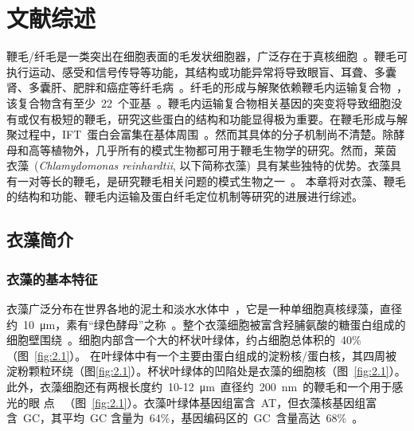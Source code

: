 \chapter{文献综述}
\renewcommand{\leftmark}{第二章\quad 文献综述}
\renewcommand{\figurename}{图}

鞭毛/纤毛是一类突出在细胞表面的毛发状细胞器，广泛存在于真核细胞\
\citep{Ishikawa2011,Hildebrandt2011,Scholey2003,Fliegauf2007}。鞭毛可执行运动、感受和信号传导等功能，其结构或功能异常将导致眼盲、耳聋、多囊肾、多囊肝、肥胖和癌症等纤毛病\
\citep{Fliegauf2007,Hildebrandt2007,Hildebrandt2011,Gerdes2009}。纤毛的形成与解聚依赖鞭毛内运输复合物\
\citep{Bhogaraju2013,Dentler2005,Engel2012,Morga2013,Pedersen2008,Scholey2003,Taschner2016,Mourao2016}，该复合物含有至少\ 22\ 个亚基\ \citep{Taschner2016a,Taschner2016,Katoh2016}。鞭毛内运输复合物相关基因的突变将导致细胞没有或仅有极短的鞭毛，研究这些蛋白的结构和功能显得极为重要。在鞭毛形成与解聚过程中，IFT\ 蛋白会富集在基体周围\ \citep{Toriyama2016,Brown2015}。然而其具体的分子机制尚不清楚。除酵母和高等植物外，几乎所有的模式生物都可用于鞭毛生物学的研究。然而，莱茵
衣藻\ (\textit{Chlamydomonas reinhardtii}, 以下简称衣藻)\ 具有某些独特的优势。衣藻具有一对等长的鞭毛，是研究鞭毛相关问题的模式生物之一\
\citep{Goodenough1992,Harris2001}。 本章将对衣藻、鞭毛的结构和功能、鞭毛内运输及蛋白纤毛定位机制等研究的进展进行综述。

\section{衣藻简介}
\subsection{衣藻的基本特征}
衣藻广泛分布在世界各地的泥土和淡水水体中\ \citep{Mussgnug2015}，它是一种单细胞真核绿藻，直径约\
\SI{10}{\um}，素有“绿色酵母”之称\ \citep{Goodenough1992,Rochaix1995,Flowers2015}。整个衣藻细胞被富含羟脯氨酸的糖蛋白组成的细胞壁围绕\ \citep{Mussgnug2015}。细胞内部含一个大的杯状叶绿体，约占细胞总体积的\ 40\% （图\ \ref{fig:2.1}）。 在叶绿体中有一个主要由蛋白组成的淀粉核/蛋白核，其四周被淀粉颗粒环绕（图\ref{fig:2.1}）。杯状叶绿体的凹陷处是衣藻的细胞核（图\ \ref{fig:2.1}）。此外，衣藻细胞还有两根长度约\ 10-\SI{12}{\um}\ 直径约\ \SI{200}{\nm}\ 的鞭毛和一个用于感光的眼
点\ \citep{Lechtreck2013} （图\ \ref{fig:2.1}）。衣藻叶绿体基因组富含\ AT，但衣藻核基因组富含\ GC，其平均\ GC 含量为\ 64\%，基因编码区的\ GC\ 含量高达\ 68\%\ \citep{Blaby2014,Grossman2007}。

